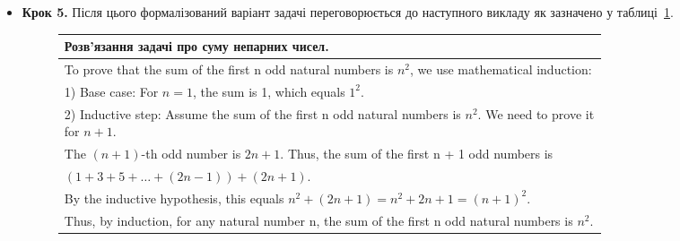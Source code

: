\begin{itemize}
    \item \textbf{Крок 5.} Після цього формалізований варіант задачі переговорюється до наступного викладу як зазначено у таблиці~\ref{tab:nl_solution}.

    \begin{figure}[h!]
        \centering
        \small
        \label{tab:nl_solution}
        \begin{tabular}{|p{0.80\linewidth}|}
        \hline
        \textbf{Розв'язання задачі про суму непарних чисел.} \\
            \hline
            To prove that the sum of the first n odd natural numbers is $n^{2}$, we use mathematical induction: \\
            1) Base case: For $n = 1$, the sum is 1, which equals $1^{2}$. \\[5pt]
            2) Inductive step: Assume the sum of the first n odd natural numbers is $n^{2}$. We need to prove it for $n + 1$. \\
            \quad The $(n+1)$-th odd number is $2n + 1$. Thus, the sum of the first n + 1 odd numbers is \\
            \quad $(1 + 3 + 5 + … + (2n - 1)) + (2n + 1)$. \\
            \quad By the inductive hypothesis, this equals $n^{2} + (2n + 1) = n^{2} + 2n + 1 = (n + 1)^{2}$. \\
            Thus, by induction, for any natural number n, the sum of the first n odd natural numbers is $n^{2}$. \\
            \hline
        \end{tabular}
    \end{figure}

\end{itemize}

